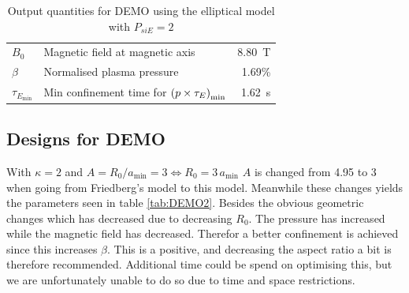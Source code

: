 \begin{table}
\begin{tabular}{llr}
		\(B_0\)                   & Magnetic field at magnetic axis                                & \SI{8.80}{\tesla}              \\
		\(\beta\)                 & Normalised plasma pressure                                     & 1.69\%                           \\
		\(\tau_{E_\mathrm{min}}\) & Min confinement time for \(\pqty{p\times\tau_E}_\mathrm{min}\) & \SI{1.62}{\second}             \\
		\bottomrule
	\end{tabular}
	\caption{Output quantities for DEMO using the elliptical model with $P_{si{E}}=2$}
	\label{tab:DEMO}
\end{table}

\subsection{Designs for DEMO}

With $\kappa=2$ and $A=R_{0}/a_{\min}=3\Leftrightarrow R_{0}=3\, a_{\min}$ $A$ is changed from 4.95 to 3 when going from Friedberg's model to this model. Meanwhile these changes yields the parameters seen in table \ref{tab:DEMO2}. Besides the obvious geometric changes which has decreased due to decreasing $R_{0}$. The pressure has increased while the magnetic field has decreased. Therefor a better confinement is achieved since this increases $\beta$. This is a positive, and decreasing the aspect ratio a bit is therefore recommended. Additional time could be spend on optimising this, but we are unfortunately unable to do so due to time and space restrictions.

